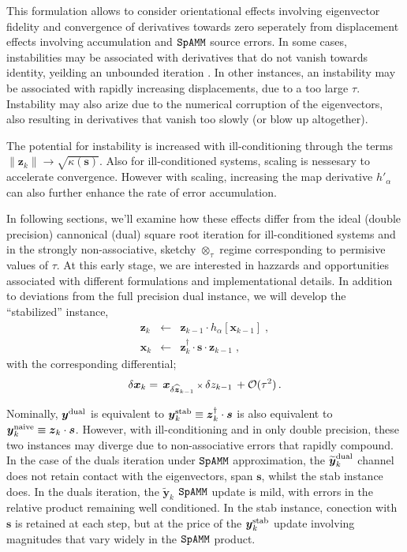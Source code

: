 \documentclass[letterpaper,twocolumn,amsmath,amsfont,amssymb,english,aps,jcp,preprintnumbers,groupaddress,nofootinbib,tightenlines,floatfix]{revtex4}
\newcommand{\mat}[1]{\boldsymbol{#1}}
\newcommand{\ot}{  {\scriptstyle \otimes}_{ \tau } }
\theoremstyle{plain}
\theoremstyle{remark}
\theoremstyle{plain}
\begin{document}
This formulation allows to consider orientational effects involving eigenvector fidelity and convergence of 
derivatives towards zero seperately from displacement effects involving accumulation and $\tt SpAMM$ source errors.
In some cases, instabilities may be associated with derivatives that do not vanish towards identity, yeilding an unbounded iteration \cite{}.
In other instances, an instability may be associated with rapidly increasing displacements, due to a too large $\tau$.  Instability 
may also arize due to the numerical corruption of the eigenvectors, also resulting in derivatives that vanish too slowly (or blow up altogether).    

The potential for
instability is increased with ill-conditioning through the terms $\lVert \mat{z}_{k} \rVert  \rightarrow \sqrt{\kappa\left(\mat{s} \right)}$.
Also for ill-conditioned systems, scaling is nessesary to accelerate convergence.  However with scaling, increasing the map 
derivative $h'_\alpha$ can also further enhance the rate of error accumulation. 

In following sections, we'll examine how these effects differ from the ideal (double precision) cannonical (dual) square root iteration
for ill-conditioned systems and in the strongly non-associative, sketchy $\ot$ regime corresponding to permisive values of $\tau$.
At this early stage, we are interested in hazzards and opportunities associated with
different formulations and implementational details.   In addition to deviations from the full precision dual instance,
we will develop the  ``stabilized'' instance,
\begin{eqnarray}\label{stabilized}
\mat{z}_k &\leftarrow& \mat{z}_{k-1} \cdot h_\alpha \left[ \mat{x}_{k-1} \right] \; , \nonumber \\
\mat{x}_k &\leftarrow&  \mat{z}^\dagger_{k} \cdot \mat{s} \cdot \mat{z}_{k-1} \; ,
\end{eqnarray}
with the corresponding differential;
\begin{equation} \label{firstorderstab}
\delta \mat{x}_k = \,  { \mat{x}}_{\delta \widehat{\mat{z}}_{k-1}}  \, {\scriptstyle \times} \, \delta z_{k-1}  \, + {\cal O}(\tau^2)  \, .
\end{equation}


Nominally, $\mat{y}^{\rm dual}$ is equivalent to $\mat{y}^{\rm stab}_k \equiv \mat{z}^\dagger_{k} \cdot \mat{s}$ 
is also equivalent to $\mat{y}^{\rm naive}_k \equiv \mat{z}_{k} \cdot \mat{s}$.
However, with ill-conditioning and in only double precision, these two instances may diverge due to non-associative errors that rapidly compound.
In the case of the duals iteration under $\tt SpAMM$ approximation, the $\widetilde{\mat{y}}^{\rm dual}_k$ channel does not retain contact 
with the eigenvectors, span $\mat{s}$, whilst the stab instance does.  
In the duals iteration, the $\widetilde{\mat{y}}_k$  $\tt SpAMM$ update 
is mild, with errors in the relative product remaining well conditioned.  
In the stab instance, conection with $\mat{s}$ is retained at each step, but at the price of the 
$\mat{y}^{\rm stab}_k$ update involving magnitudes that vary widely in the $\tt SpAMM$ product.     
\end{document}
